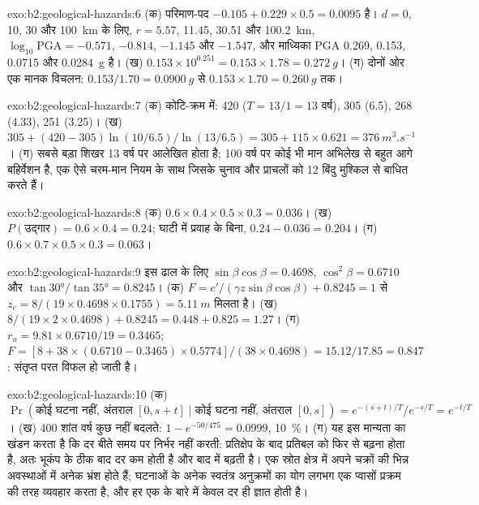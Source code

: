 \begin{solution}{exo:b2:geological-hazards:6}
(क) परिमाण-पद $-0.105 + 0.229 \times 0.5 = 0.0095$ है। $d = 0$, 10, 30 और
\qty{100}{km} के लिए, $r = 5.57$, 11.45, 30.51 और \qty{100.2}{km}, $\log_{10}\mathrm{PGA} = -0.571$,
$-0.814$, $-1.145$ और $-1.547$, और माध्यिका PGA 0.269, 0.153, 0.0715 और \qty{0.0284}{g} है।
(ख) $0.153 \times 10^{0.251} = 0.153 \times 1.78 = \qty{0.272}{g}$। (ग) दोनों ओर एक मानक
विचलन: $0.153/1.70 = \qty{0.0900}{g}$ से $0.153 \times 1.70 = \qty{0.260}{g}$ तक।
\end{solution}

\begin{solution}{exo:b2:geological-hazards:7}
(क) कोटि-क्रम में: 420 ($T = 13/1 = 13$ वर्ष), 305 (6.5), 268 (4.33), 251 (3.25)। (ख) $305 + (420 -
305)\ln(10/6.5)/\ln(13/6.5) = 305 + 115 \times 0.621 = \qty{376}{m^3.s^{-1}}$। (ग) सबसे बड़ा शिखर
13 वर्ष पर आलेखित होता है; 100 वर्ष पर कोई भी मान अभिलेख से बहुत आगे बहिर्वेशन है, एक ऐसे
चरम-मान नियम के साथ जिसके चुनाव और प्राचलों को 12 बिंदु मुश्किल से बाधित करते हैं।
\end{solution}

\begin{solution}{exo:b2:geological-hazards:8}
(क) $0.6 \times 0.4 \times 0.5 \times 0.3 = 0.036$। (ख) $P(\text{उद्गार}) = 0.6 \times 0.4 = 0.24$;
घाटी में प्रवाह के बिना, $0.24 - 0.036 = 0.204$। (ग) $0.6 \times 0.7 \times 0.5 \times 0.3 =
0.063$।
\end{solution}

\begin{solution}{exo:b2:geological-hazards:9}
इस ढाल के लिए $\sin\beta\cos\beta = 0.4698$, $\cos^2\beta = 0.6710$ और $\tan\ang{30}/\tan\ang{35} =
0.8245$। (क) $F = c'/(\gamma z\sin\beta\cos\beta) + 0.8245 = 1$ से $z_c = 8/(19 \times 0.4698
\times 0.1755) = \qty{5.11}{m}$ मिलता है। (ख) $8/(19 \times 2 \times 0.4698) + 0.8245 = 0.448 + 0.825 =
1.27$। (ग) $r_u = 9.81 \times 0.6710/19 = 0.3465$; $F = [8 + 38 \times (0.6710 - 0.3465) \times
0.5774]/(38 \times 0.4698) = 15.12/17.85 = 0.847$: संतृप्त परत विफल हो जाती है।
\end{solution}

\begin{solution}{exo:b2:geological-hazards:10}
(क) $\Pr(\text{कोई घटना नहीं, अंतराल } [0, s+t] \mid \text{कोई घटना नहीं, अंतराल } [0, s]) = e^{-(s+t)/T}/e^{-s/T} = e^{-t/T}$।
(ख) 400 शांत वर्ष कुछ नहीं बदलते: $1 - e^{-50/475} = 0.0999$, \qty{10}{\percent}। (ग) यह
इस मान्यता का खंडन करता है कि दर बीते समय पर निर्भर नहीं करती: प्रतिक्षेप के बाद
प्रतिबल को फिर से बढ़ना होता है, अतः भूकंप के ठीक बाद दर कम होती है और बाद में बढ़ती है। एक स्रोत
क्षेत्र में अपने चक्रों की भिन्न अवस्थाओं में अनेक भ्रंश होते हैं; घटनाओं के अनेक स्वतंत्र अनुक्रमों का योग
लगभग एक प्वासों प्रक्रम की तरह व्यवहार करता है, और हर एक के बारे में केवल दर ही ज्ञात होती है।
\end{solution}

